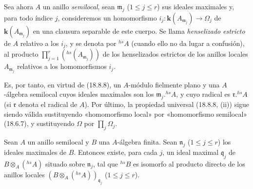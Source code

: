 \begin{env}[18.8.9]
\label{IV.18.8.9}
Sea ahora $A$ un anillo \emph{semilocal}, sean $\mathfrak m_j$ ($1\leq j\leq r$) sus ideales maximales y, para todo índice $j$, consideremos un homomorfismo $i_j:\boldsymbol{k}(A_{\mathfrak m_j})\to\Omega_j$ de $\boldsymbol{k}(A_{\mathfrak m_j})$ en una clausura separable de este cuerpo. Se llama \emph{henselizado estricto} de $A$ relativo a los $i_j$, y se denota por ${}^{hs}\!A$ (cuando ello no da lugar a confusión), al producto $\prod_{j=1}^r({}^{hs}(A_{\mathfrak m_j}))$ de los henselizados estrictos de los anillos locales $A_{\mathfrak m_j}$ relativos a los homomorfismos $i_j$.


Es, por tanto, en virtud de (18.8.8), un $A$-módulo fielmente plano y una $A$-álgebra semilocal cuyos ideales maximales son los $\mathfrak m_j.{}^{hs}\!A$, y cuyo radical es $\mathfrak r.{}^{hs}\!A$ (si $\mathfrak r$ denota el radical de $A$). Por último, la propiedad universal (18.8.8, (ii)) sigue siendo válida sustituyendo «homomorfismo local» por «homomorfismo semilocal» (18.6.7), y sustituyendo $\Omega$ por $\prod_j\Omega_j$.
\end{env}

\begin{proposition}[18.8.10]
\label{IV.18.8.10}
Sean $A$ un anillo semilocal y $B$ una $A$-álgebra finita. Sean $\mathfrak n_j$ \textup{($1\leq j\leq r$)} los ideales maximales de $B$. Entonces existe, para cada $j$, un ideal maximal $\mathfrak q_j$ de $B\otimes_A({}^{hs}\!A)$ situado sobre $\mathfrak n_j$, tal que ${}^{hs}\!B$ es isomorfo al producto directo de los anillos locales $(B\otimes_A({}^{hs}\!A))_{\mathfrak q_j}$ \textup{($1\leq j\leq r$)}.
\end{proposition}

